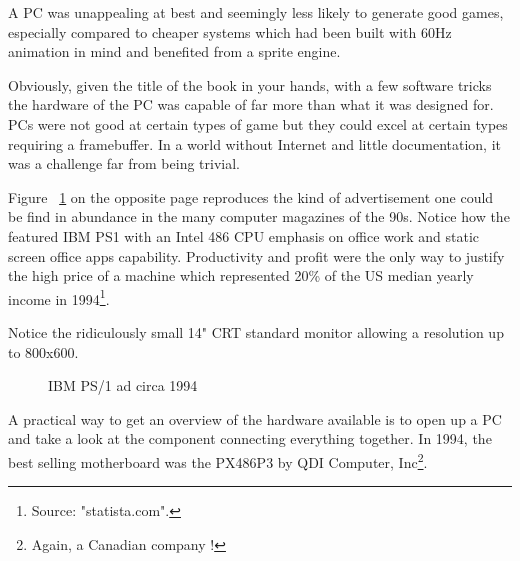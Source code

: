 \par
 A PC was unappealing at best and seemingly less likely to generate good games, especially compared to cheaper systems which had been built with 60Hz animation in mind and benefited from a sprite engine.\\
 \par
  Obviously, given the title of the book in your hands, with a few software tricks the hardware of the PC was capable of far more than what it was designed for. PCs were not good at certain types of game but they could excel at certain types requiring a framebuffer. In a world without Internet and little documentation, it was a challenge far from being trivial.\\
\par

Figure ~\ref{ibm_ps1_top} on the opposite page reproduces the kind of advertisement one could be find in abundance in the many computer magazines of the 90s. Notice how the featured IBM PS1 with an Intel 486 CPU emphasis on office work and static screen office apps capability. Productivity and profit were the only way to justify the high price of a machine which represented 20\% of the US median yearly income in 1994\footnote{Source: "statista.com".}.\\
\par
Notice the ridiculously small 14" CRT standard monitor allowing a resolution up to 800x600.
\par
\begin{figure}[H] \centering
{}
\caption{IBM PS/1 ad circa 1994}
\label{ibm_ps1_top}
\end{figure}


















\cleartoleftpage
 
A practical way to get an overview of the hardware available is to open up a PC and take a look at the component connecting everything together. In 1994, the best selling motherboard was the PX486P3 by QDI Computer, Inc\footnote{Again, a Canadian company  !}.\\

